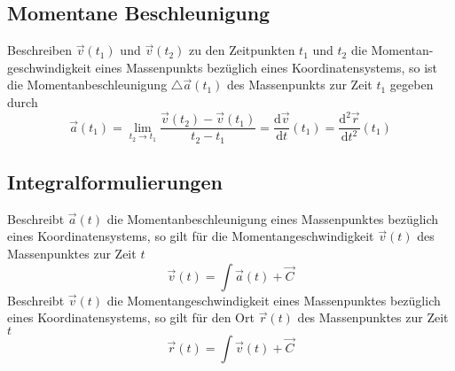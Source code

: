 \subsection{Momentane Beschleunigung}
Beschreiben $\overrightarrow{v}\left(t_1\right)$ und $\overrightarrow{v}\left(t_2\right)$ zu den Zeitpunkten $t_1$ und $t_2$ die Momentan-geschwindigkeit eines Massenpunkts bezüglich eines Koordinatensystems, so ist die Momentanbeschleunigung $\triangle \overrightarrow{a}\left(t_1\right)$ des Massenpunkts zur Zeit $t_1$ gegeben durch
\begin{equation}
\boxed{\overrightarrow{a}\left(t_1\right)=\lim_{t_2\rightarrow t_1}\dfrac{\overrightarrow{v}\left(t_2\right)-\overrightarrow{v}\left(t_1\right)}{t_2-t_1}=\dfrac{\text{d}\overrightarrow{v}}{\text{d}t}\left(t_1\right)=\dfrac{\text{d}^2\overrightarrow{r}}{\text{d}t^2}\left(t_1\right)}
\end{equation}
\subsection{Integralformulierungen}
Beschreibt $\overrightarrow{a}\left(t\right)$ die Momentanbeschleunigung eines Massenpunktes bezüglich eines Koordinatensystems, so gilt für die Momentangeschwindigkeit $\overrightarrow{v}\left(t\right)$ des Massenpunktes zur Zeit $t$
\begin{equation} 
\boxed{\overrightarrow{v}\left(t\right)=\displaystyle \int \overrightarrow{a}\left(t\right)+\overrightarrow{C}}
\end{equation} 
Beschreibt $\overrightarrow{v}\left(t\right)$ die Momentangeschwindigkeit eines Massenpunktes bezüglich eines Koordinatensystems, so gilt für den Ort $\overrightarrow{r}\left(t\right)$ des Massenpunktes zur Zeit $t$
\begin{equation} 
\boxed{\overrightarrow{r}\left(t\right)=\displaystyle \int \overrightarrow{v}\left(t\right)+\overrightarrow{C}}
\end{equation} 
